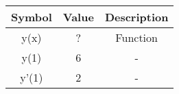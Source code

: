 \begin{tabular}{|c|c|c|}
    \hline
    Symbol & Value & Description \\
    \hline
    y(x) & ? & Function\\
    \hline
    y(1) & 6 & - \\
    \hline 
    y'(1) & 2 & - \\
    \hline 
\end{tabular}